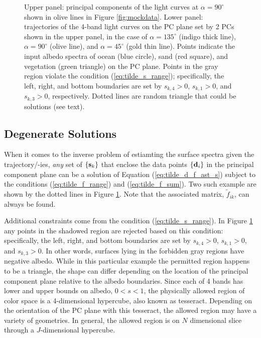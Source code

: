 \documentclass[iop,numberedappendix,apj]{emulateapj}
\def\fast{\tilde f}
\begin{document}
\begin{figure}[t]
    \caption{Upper panel: principal components of the light curves at $\alpha = 90^{\circ }$ shown in olive lines in Figure \ref{fig:mockdata}. Lower panel: trajectories of the 4-band light curves on the PC plane set by 2 PCs shown in the upper panel, in the case of $\alpha = 135^{\circ }$ (indigo thick line), $\alpha = 90^{\circ }$ (olive line), and $\alpha = 45^{\circ }$ (gold thin line). Points indicate the input albedo spectra of ocean (blue circle), sand (red square), and vegetation (green triangle) on the PC plane. Points in the gray region violate the condition (\ref{eq:tilde_s_range}); specifically, the left, right, and bottom boundaries are set by $s_{k,4} > 0$, $s_{k,1} > 0$, and $s_{k,3}> 0$, respectively. 
Dotted lines are random triangle that could be solutions (see text). }
    \label{fig:trajectory}
\end{figure}

\subsection{Degenerate Solutions}
\label{ss:degeneracy}

When it comes to the inverse problem of estiamting the surface spectra given the trajectory/-ies, {\it any} set of $\{ {\bf s}_k \}$ that enclose the data points $\{{\bf d}_i\}$ in the principal component plane can be a solution of Equation (\ref{eq:tilde_d_f_ast_s}) subject to the conditions (\ref{eq:tilde_f_range}) and (\ref{eq:tilde_f_sum}). 
Two such example are shown by the dotted lines in Figure \ref{fig:trajectory}. 
Note that the associated matrix, $\fast _{ik}$, can always be found. 

Additional constraints come from the condition (\ref{eq:tilde_s_range}). 
In Figure \ref{fig:trajectory} any points in the shadowed region are rejected based on this condition: specifically, the left, right, and bottom boundaries are set by $s_{k,4}> 0$, $s_{k,1}> 0$, and $s_{k,3}> 0$. 
In other words, surfaces lying in the forbidden gray regions have negative albedo. 
While in this particular example the permitted region happens to be a triangle, the shape can differ depending on the location of the principal component plane relative to the albedo boundaries. 
Since each of 4 bands has lower and upper bounds on albedo, $0<s<1$, the physically allowed region of color space is a 4-dimensional hypercube, also known as tesseract. Depending on the orientation of the PC plane with this tesseract, the allowed region may have a variety of geometries. 
In general, the allowed region is on $N$ dimensional slice through a $J$-dimensional hypercube. 
\end{document}
